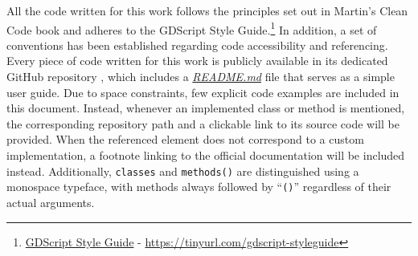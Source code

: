 All the code written for this work follows the principles set out in Martin's Clean Code book \cite{Martin:2008:CC} and adheres to the GDScript Style Guide.\footnote{\href{https://docs.godotengine.org/en/stable/tutorials/scripting/gdscript/gdscript_styleguide.html}{GDScript Style Guide} - \url{https://tinyurl.com/gdscript-styleguide}}
In addition, a set of conventions has been established regarding code accessibility and referencing.
Every piece of code written for this work is publicly available in its dedicated GitHub repository \cite{URL::TFG}, which includes a \href{https://github.com/fsande/TFG---Eric-Rios/blob/main/README.md}{\textit{README.md}} file that serves as a simple user guide.
Due to space constraints, few explicit code examples are included in this document. 
Instead, whenever an implemented class or method is mentioned, the corresponding repository path and a clickable link to its source code will be provided.
When the referenced element does not correspond to a custom implementation, a footnote linking to the official documentation will be included instead.
Additionally, \texttt{classes} and \texttt{methods()} are distinguished using a monospace typeface, with methods always followed by “\texttt{()}” regardless of their actual arguments.
